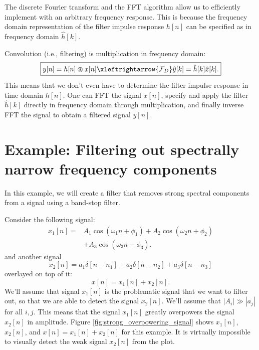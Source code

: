 The discrete Fourier transform and the FFT algorithm allow us to
efficiently implement  with an arbitrary frequency
response. This is because the frequency domain representation of the
filter impulse response $h[n]$ can be specified as in frequency domain
$\hat{h}[k]$.

Convolution (i.e., filtering) is multiplication in frequency domain:
\begin{equation}
  \boxed{
    y[n] = h[n]\circledast x[n] \xleftrightarrow{\mathcal{F}_{D}} \hat{y}[k] = \hat{h}[k]\hat{x}[k].
    }
\end{equation}
This means that we don't even have to determine the filter impulse
response in time domain $h[n]$. One can FFT the signal $x[n]$, specify and
apply the filter $\hat{h}[k]$ directly in frequency domain through
multiplication, and finally inverse FFT the signal to obtain a
filtered signal $y[n]$.

\section{Example: Filtering out spectrally narrow frequency components}

In this example, we will create a filter that removes strong spectral
components from a signal using a band-stop filter.

Consider the following signal:
\begin{align}
  x_1[n] = &A_1\cos(\omega_1 n + \phi_1) + A_2\cos(\omega_2 n + \phi_2) \\
     & + A_3\cos(\omega_3 n + \phi_3).
\end{align}
and another signal
\begin{equation}
x_2[n] = a_1\delta[n-n_1] + a_2\delta[n - n_2] + a_3\delta[n-n_3]
\end{equation}
overlayed on top of it:
\begin{equation}
x[n] = x_1[n] + x_2[n].
\end{equation}
We'll assume that signal $x_1[n]$ is the problematic signal that we
want to filter out, so that we are able to detect the signal
$x_2[n]$. We'll assume that $|A_i| \gg |a_j|$ for all $i,j$. This
means that the signal $x_1[n]$ greatly overpowers the signal $x_2[n]$ in
amplitude. Figure \ref{fig:strong_overpowering_signal} shows $x_1[n]$,
$x_2[n]$, and $x[n]=x_1[n]+x_2[n]$ for this example. It is virtually
impossible to visually detect the weak signal $x_2[n]$ from the plot.

